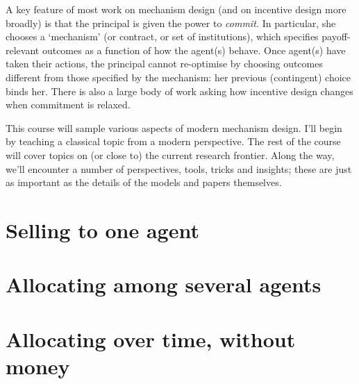 \documentclass[11pt,letterpaper,reqno,oneside]{book}
\begin{document}
A key feature of most work on mechanism design (and on incentive design more broadly) is that the principal is given the power to \emph{commit.}
In particular, she chooses a `mechanism' (or contract, or set of institutions), which specifies payoff-relevant outcomes as a function of how the agent(s) behave.
Once agent(s) have taken their actions, the principal cannot re-optimise by choosing outcomes different from those specified by the mechanism: her previous (contingent) choice binds her.
There is also a large body of work asking how incentive design changes when commitment is relaxed.

This course will sample various aspects of modern mechanism design.
I'll begin by teaching a classical topic from a modern perspective.
The rest of the course will cover topics on (or close to) the current research frontier.
Along the way, we'll encounter a number of perspectives, tools, tricks and insights; these are just as important as the details of the models and papers themselves.



\chapter{Selling to one agent}
\label{ch1}





\chapter{Allocating among several agents}
\label{ch2}





\chapter{Allocating over time, without money}
\label{ch3}


\end{document}
